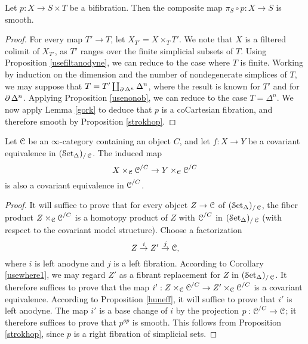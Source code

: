 \begin{proposition}\label{longwait5}
Let $p: X \rightarrow S \times T$ be a bifibration. Then the composite map
$\pi_{S} \circ p: X \rightarrow S$ is smooth.
\end{proposition}

\begin{proof}
For every map $T' \rightarrow T$, let $X_{T'} = X \times_{T} T'$. We note that
$X$ is a filtered colimit of $X_{T'}$, as $T'$ ranges over the finite simplicial subsets
of $T$. Using Proposition \ref{usefiltanodyne}, we can reduce to the case where $T$ is finite.
Working by induction on the dimension and the number of nondegenerate simplices of
$T$, we may suppose that $T = T' \coprod_{ \operatorname{\partial} \Delta^n } \Delta^n$, where the result is known
for $T'$ and for $\operatorname{\partial} \Delta^n$. Applying Proposition \ref{usenonob}, we can reduce to the case $T = \Delta^n$. We now apply Lemma \ref{gork} to deduce that $p$ is a coCartesian fibration, and therefore smooth by Proposition \ref{strokhop}.
\end{proof}

\begin{lemma}\label{covg}
Let $\operatorname{\mathcal{C}}$ be an $\infty$-category containing an object $C$, and let
$f: X \rightarrow Y$ be a covariant equivalence in $(\operatorname{\mathcal{S}et_{\Delta}})_{/\operatorname{\mathcal{C}}}$. The induced map
$$ X \times_{\operatorname{\mathcal{C}}} \operatorname{\mathcal{C}}^{/C} \rightarrow Y \times_{\operatorname{\mathcal{C}}} \operatorname{\mathcal{C}}^{/C}$$ is also a covariant equivalence in $\operatorname{\mathcal{C}}^{/C}$.
\end{lemma}

\begin{proof}
It will suffice to prove that for every object $Z \rightarrow \operatorname{\mathcal{C}}$ of $(\operatorname{\mathcal{S}et_{\Delta}})_{/\operatorname{\mathcal{C}}}$, the fiber
product $Z \times_{\operatorname{\mathcal{C}}} \operatorname{\mathcal{C}}^{/C}$ is a homotopy product of $Z$ with
$\operatorname{\mathcal{C}}^{/C}$ in $(\operatorname{\mathcal{S}et_{\Delta}})_{/\operatorname{\mathcal{C}}}$ (with respect to the covariant model structure). Choose a factorization
$$ Z \stackrel{i}{\rightarrow} Z' \stackrel{j}{\rightarrow} \operatorname{\mathcal{C}},$$
where $i$ is left anodyne and $j$ is a left fibration. According to Corollary \ref{usewhere1}, we may regard $Z'$ as a fibrant replacement for $Z$ in $(\operatorname{\mathcal{S}et_{\Delta}})_{/\operatorname{\mathcal{C}}}$. It therefore suffices to prove
that the map $i': Z \times_{\operatorname{\mathcal{C}}} \operatorname{\mathcal{C}}^{/C} \rightarrow Z' \times_{\operatorname{\mathcal{C}}} \operatorname{\mathcal{C}}^{/C}$ is a covariant equivalence. According to Proposition \ref{huneff}, it will suffice to prove that $i'$ is left anodyne.
The map $i'$ is a base change of $i$ by the projection $p: \operatorname{\mathcal{C}}^{/C} \rightarrow \operatorname{\mathcal{C}}$; it therefore suffices to prove that $p^{op}$ is smooth. This follows from Proposition \ref{strokhop}, since
$p$ is a right fibration of simplicial sets.
\end{proof}

